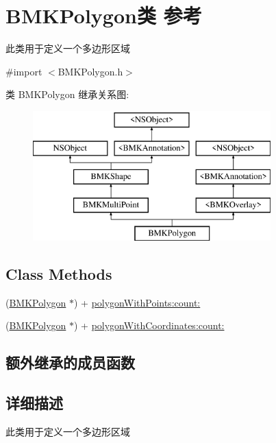 \hypertarget{interface_b_m_k_polygon}{\section{B\+M\+K\+Polygon类 参考}
\label{interface_b_m_k_polygon}
}


此类用于定义一个多边形区域  




{\ttfamily \#import $<$B\+M\+K\+Polygon.\+h$>$}

类 B\+M\+K\+Polygon 继承关系图\+:\begin{figure}[H]
\begin{center}
\leavevmode
\includegraphics[height=5.000000cm]{interface_b_m_k_polygon}
\end{center}
\end{figure}
\subsection*{Class Methods}
\begin{DoxyCompactItemize}
\item 
(\hyperlink{interface_b_m_k_polygon}{B\+M\+K\+Polygon} $\ast$) + \hyperlink{interface_b_m_k_polygon_a74b92a200709fb4c6718b26ebdfcc50a}{polygon\+With\+Points\+:count\+:}
\item 
(\hyperlink{interface_b_m_k_polygon}{B\+M\+K\+Polygon} $\ast$) + \hyperlink{interface_b_m_k_polygon_aa3de0deeba040969c9211b64c59831f2}{polygon\+With\+Coordinates\+:count\+:}
\end{DoxyCompactItemize}
\subsection*{额外继承的成员函数}


\subsection{详细描述}
此类用于定义一个多边形区域 

